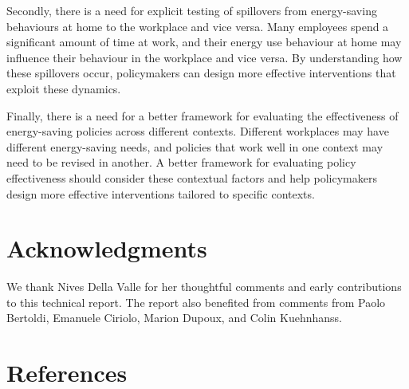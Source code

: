 \documentclass[
  11pt,
  captions=heading]{scrreport}
\begin{document}
Secondly, there is a need for explicit testing of spillovers from
energy-saving behaviours at home to the workplace and vice versa. Many
employees spend a significant amount of time at work, and their energy
use behaviour at home may influence their behaviour in the workplace and
vice versa. By understanding how these spillovers occur, policymakers
can design more effective interventions that exploit these dynamics.

Finally, there is a need for a better framework for evaluating the
effectiveness of energy-saving policies across different contexts.
Different workplaces may have different energy-saving needs, and
policies that work well in one context may need to be revised in
another. A better framework for evaluating policy effectiveness should
consider these contextual factors and help policymakers design more
effective interventions tailored to specific contexts.

\hypertarget{acknowledgments}{%
\chapter{Acknowledgments}\label{acknowledgments}}

We thank Nives Della Valle for her thoughtful comments and early
contributions to this technical report. The report also benefited from
comments from Paolo Bertoldi, Emanuele Ciriolo, Marion Dupoux, and Colin
Kuehnhanss.

\hypertarget{references}{%
\chapter*{References}\label{references}}
\end{document}
